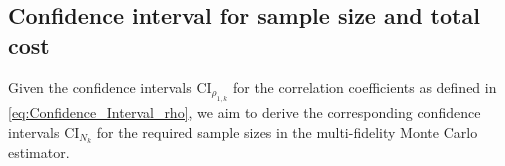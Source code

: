 
    


%
\subsection{Confidence interval for sample size and total cost}
Given the confidence intervals $\text{CI}_{\rho_{1,k}}$ for the correlation coefficients as defined in \eqref{eq:Confidence_Interval_rho}, we aim to derive the corresponding confidence intervals $\text{CI}_{N_k}$ for the required sample sizes in the multi-fidelity Monte Carlo estimator. 

